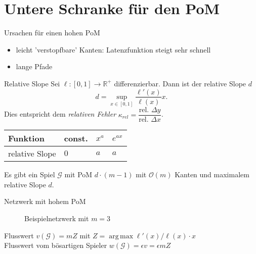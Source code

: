 \documentclass{beamer}
\DeclareMathOperator*{\argmax}{arg\,max}
\begin{document}
\section{Untere Schranke für den PoM}

\begin{frame}{Ursachen für einen hohen PoM}
	\begin{itemize}
		\item leicht 'verstopfbare' Kanten: Latenzfunktion steigt sehr schnell
		\item lange Pfade
	\end{itemize}
\end{frame}

\begin{frame}{Relative Slope}
	Sei $\ell : [0,1] \to \mathbb R^+$ differenzierbar.
	Dann ist der \alert{relative Slope} $d$
	\[ d = \sup_{x \in [0,1]} \dfrac{\ell'(x)}{\ell(x)} x .\]
	Dies entspricht dem \emph{relativen Fehler} $\kappa_{rel} = \dfrac{\text{rel. } \Delta y}{\text{rel. } \Delta x}$.
	
	\begin{table}[]
		\begin{tabular}{@{}llll@{}}
			\toprule
			Funktion       & const. & $x^a$ & $e^{ax}$ \\ \midrule
			relative Slope & $0$      & $a$     & $a$        \\ \bottomrule
		\end{tabular}
	\end{table}
	\pause
	\begin{theorem}
		Es gibt ein Spiel $\mathcal G$ mit \alert{PoM $d \cdot (m-1)$} mit $\mathcal O(m)$ Kanten und maximalem relative Slope $d$.
	\end{theorem}
\end{frame}

\begin{frame}{Netzwerk mit hohem PoM}
	\begin{figure}
	\caption{Beispielnetzwerk mit $m=3$}
	\end{figure}
	
	Flusswert $v(\mathcal G) = mZ$ mit $Z = \argmax \ell'(x)/\ell(x) \cdot x$ \\
	Flusswert vom bösartigen Spieler $w(\mathcal G) = \epsilon v = \epsilon m Z$
\end{frame}
\end{document}
